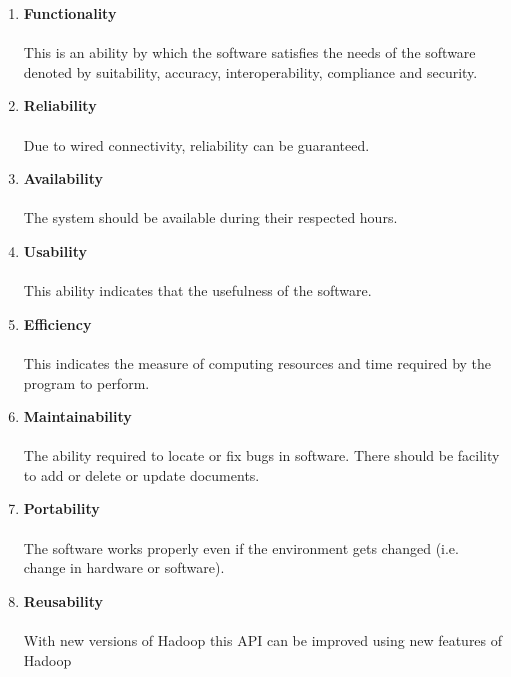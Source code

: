 \documentclass[oneside,a4paper,12pt]{report}
\begin{document}
\begin{enumerate}
\item \textbf{Functionality}
\paragraph{}
This is an ability by which the software satisfies the needs of the software denoted by suitability, accuracy, interoperability, compliance and security.

\item \textbf{Reliability}
\paragraph{}
Due to wired connectivity, reliability can be guaranteed.

\item \textbf{Availability}
\paragraph{}
The system should be available during their respected hours.

\item \textbf{Usability}
\paragraph{}
This ability indicates that the usefulness of the software.

\item \textbf{Efficiency}
\paragraph{}    
This indicates the measure of computing resources and time required by the program to perform.

\item \textbf{Maintainability}
\paragraph{}
The ability required to locate or fix bugs in software. There should be facility to add or delete or update documents.

\item \textbf{Portability}
\paragraph{}
The software works properly even if the environment gets changed (i.e. change in hardware or software).

\item \textbf{Reusability}
\paragraph{}
With new versions of Hadoop this API can be improved using new features of Hadoop
\end{enumerate}
\end{document}
